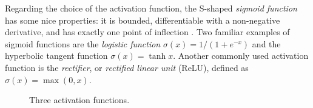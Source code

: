 \documentclass[a4paper,11pt,titlepage]{article}
\theoremstyle{definition}
\theoremstyle{plain}
\theoremstyle{remark}
\begin{document}
Regarding the choice of the activation function, the S-shaped \textit{sigmoid function} has some nice properties: it is bounded, differentiable with a non-negative derivative, and has exactly one point of inflection \cite{HanMoraga}. Two familiar examples of sigmoid functions are the \textit{logistic function} $\sigma(x)=1/\left(1+e^{-x}\right)$ and the hyperbolic tangent function $\sigma(x)=\tanh x$. Another commonly used activation function is the \textit{rectifier}, or \textit{rectified linear unit} (ReLU), defined as $\sigma(x)=\max(0, x)$.

\begin{figure}[htbp]
    \centering
    \begin{minipage}{0.32\textwidth}
        \centering
    \end{minipage}
    \hfill
    \begin{minipage}{0.32\textwidth}
        \centering
    \end{minipage}
    \hfill
    \begin{minipage}{0.32\textwidth}
        \centering
    \end{minipage}
    \centering
    \caption{Three activation functions.}
\end{figure}
\end{document}

